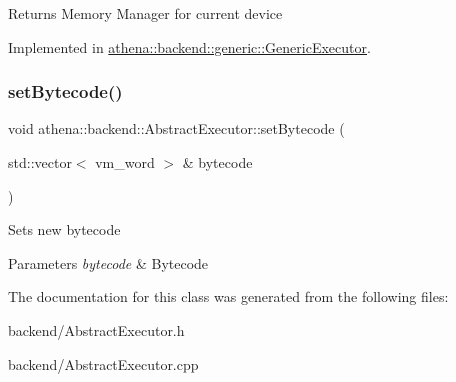 \begin{DoxyReturn}{Returns}
Memory Manager for current device 
\end{DoxyReturn}


Implemented in \mbox{\hyperlink{classathena_1_1backend_1_1generic_1_1_generic_executor_a0560a1dfc0c70ebef0b5be26bb82b9c5}{athena\+::backend\+::generic\+::\+Generic\+Executor}}.

\mbox{\label{classathena_1_1backend_1_1_abstract_executor_afa06d9875ee6c53986873f29db380893}} 
\subsubsection{\texorpdfstring{set\+Bytecode()}{setBytecode()}}
{\footnotesize\ttfamily void athena\+::backend\+::\+Abstract\+Executor\+::set\+Bytecode (\begin{DoxyParamCaption}\item[{std\+::vector$<$ vm\+\_\+word $>$ \&}]{bytecode }\end{DoxyParamCaption})}

Sets new bytecode 
\begin{DoxyParams}{Parameters}
{\em bytecode} & Bytecode \\
\hline
\end{DoxyParams}


The documentation for this class was generated from the following files\+:\begin{DoxyCompactItemize}
\item 
backend/Abstract\+Executor.\+h\item 
backend/Abstract\+Executor.\+cpp\end{DoxyCompactItemize}
